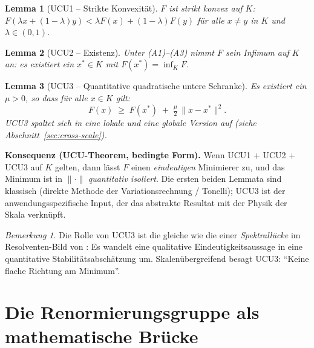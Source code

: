 \documentclass[11pt,a4paper]{article}
\newtheorem{lemma}{Lemma}
\theoremstyle{remark}
\newtheorem*{remark}{Bemerkung}
\begin{document}
\begin{lemma}[UCU1 -- Strikte Konvexität]
\label{lem:ucu1}
$F$ ist \emph{strikt konvex} auf $K$:
$F(\lambda x + (1{-}\lambda) y) < \lambda F(x) + (1{-}\lambda)F(y)$
für alle $x \neq y$ in $K$ und $\lambda \in (0,1)$.
\end{lemma}

\begin{lemma}[UCU2 -- Existenz]
\label{lem:ucu2}
Unter (A1)--(A3) nimmt $F$ sein Infimum auf $K$ an:
es existiert ein $x^* \in K$ mit $F(x^*) = \inf_K F$.
\end{lemma}

\begin{lemma}[UCU3 -- Quantitative quadratische untere Schranke]
\label{lem:ucu3}
Es existiert ein $\mu > 0$, so dass für alle $x \in K$ gilt:
\[
F(x) \;\ge\; F(x^*) \;+\; \tfrac{\mu}{2}\,\|x - x^*\|^2.
\]
UCU3 spaltet sich in eine \emph{lokale} und eine \emph{globale} Version auf (siehe Abschnitt~\ref{sec:cross-scale}).
\end{lemma}

\noindent\textbf{Konsequenz (UCU-Theorem, bedingte Form).}
Wenn UCU1 + UCU2 + UCU3 auf $K$ gelten, dann lässt $F$ einen \emph{eindeutigen} Minimierer zu, und das Minimum ist in $\|\cdot\|$ \emph{quantitativ isoliert}. Die ersten beiden Lemmata sind klassisch (direkte Methode der Variationsrechnung / Tonelli); UCU3 ist der anwendungsspezifische Input, der das abstrakte Resultat mit der Physik der Skala verknüpft.

\begin{remark}
Die Rolle von UCU3 ist die gleiche wie die einer \emph{Spektrallücke} im Resolventen-Bild von \cite{GeigerZookeeper-2026}: Es wandelt eine qualitative Eindeutigkeitsaussage in eine quantitative Stabilitätsabschätzung um. Skalenübergreifend besagt UCU3: ``Keine flache Richtung am Minimum''.
\end{remark}

\section{Die Renormierungsgruppe als mathematische Brücke}
\label{sec:rg-bridge}
\end{document}
